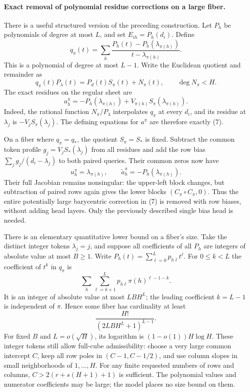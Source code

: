 \documentclass[11pt]{article}
\begin{document}
\paragraph{Exact removal of polynomial residue corrections on a large fiber.}
There is a useful structured version of the preceding construction.
Let $P_h$ be polynomials of degree at most $L$, and set
$E_{ih}=P_h(d_i)$. Define
\[
 q_\pi(t)=\sum_h\frac{P_h(t)-P_h(\lambda_{\pi(h)})}
                         {t-\lambda_{\pi(h)}}.
\]
This is a polynomial of degree at most $L-1$. Write the Euclidean
quotient and remainder as
\[
 q_\pi(t)P_\lambda(t)=P_d(t)S_\pi(t)+N_\pi(t),
 \qquad \deg N_\pi<H.
 \tag{6}
\]
The exact residues on the regular sheet are
\[
 a_h^\pi=-P_h(\lambda_{\pi(h)})
                 +V_{\pi(h)}S_\pi(\lambda_{\pi(h)}).
 \tag{7}
\]
Indeed, the rational function $N_\pi/P_\lambda$ interpolates $q_\pi$
at every $d_i$, and its residue at $\lambda_j$ is
$-V_jS_\pi(\lambda_j)$. The defining equations for $a^\pi$ are
therefore exactly (7).

On a fiber where $q_\pi=q_*$, the quotient $S_\pi=S_*$ is fixed.
Subtract the common token profile $g_j=V_jS_*(\lambda_j)$ from
all residues and add the row bias
$\sum_jg_j/(d_i-\lambda_j)$ to both paired queries. Their common
zeros now have
\[
 u_h^\pi=\lambda_{\pi(h)},\qquad
 \widetilde a_h^\pi=-P_h(\lambda_{\pi(h)}).
 \tag{8}
\]
Their full Jacobian remains nonsingular: the upper-left block changes,
but subtraction of paired rows again gives the lower blocks
$(C_\pi\circ C_\pi,0)$. Thus the entire potentially large barycentric
correction in (7) is removed with row biases, without adding head
layers. Only the previously described single bias head is needed.

There is an elementary quantitative lower bound on a fiber's size.
Take the distinct integer tokens $\lambda_j=j$, and suppose all
coefficients of all $P_h$ are integers of absolute value at most
$B\geq1$. Write $P_h(t)=\sum_{\ell=0}^Lp_{h\ell}t^\ell$.
For $0\leq k<L$ the coefficient of $t^k$ in $q_\pi$ is
\[
 \sum_h\sum_{\ell=k+1}^L
                  p_{h\ell}\pi(h)^{\ell-1-k}.
 \tag{9}
\]
It is an integer of absolute value at most $LBH^L$; the leading
coefficient $k=L-1$ is independent of $\pi$. Hence some fiber has
cardinality at least
\[
 \frac{H!}{(2LBH^L+1)^{L-1}}.
 \tag{10}
\]
For fixed $B$ and $L=o(\sqrt H)$, its logarithm is
$(1-o(1))H\log H$. These integer tokens still allow full-cube
admissibility: choose a very large common intercept $C$, keep all row
poles in $(C-1,C-1/2)$, and use column slopes in small neighborhoods
of $1,\ldots,H$. For any finite requested numbers of rows and columns,
$C>2(r+s(H+1)+1)$ is sufficient. The polynomial values and numerator
coefficients may be large; the model places no size bound on them.
\end{document}
